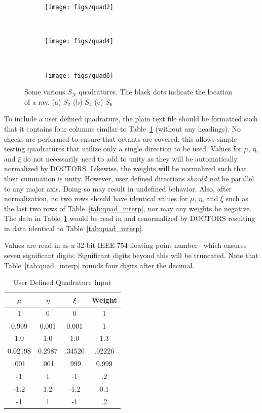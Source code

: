 \begin{figure}
    \centering
    \begin{subfigure}[b]{0.3\textwidth}
        \texttt{[image: figs/quad2]}
        \caption{}
        \label{fig:quad2}
    \end{subfigure}
    ~ 
    \begin{subfigure}[b]{0.3\textwidth}
        \texttt{[image: figs/quad4]}
        \caption{}
        \label{fig:quad4}
    \end{subfigure}
    ~ 
    \begin{subfigure}[b]{0.3\textwidth}
        \texttt{[image: figs/quad6]}
        \caption{}
        \label{fig:quad6}
    \end{subfigure}
    \caption{Some various $S_N$ quadratures. The black dots indicate the location of a ray. (a) $S_2$ (b) $S_4$ (c) $S_6$ }\label{fig:quad}
\end{figure}

To include a user defined quadrature, the plain text file should be formatted such that it contains four columns similar to Table~\ref{tab:quad_format} (without any headings). No checks are performed to ensure that octants are covered, this allows simple testing quadratures that utilize only a single direction to be used. Values for $\mu$, $\eta$, and $\xi$ do not necessarily need to add to unity as they will be automatically normalized by DOCTORS. Likewise, the weights will be normalized such that their summation is unity. However, user defined directions \textit{should not} be parallel to any major axis. Doing so may result in undefined behavior. Also, after normalization, no two rows should have identical values for $\mu$, $\eta$, and $\xi$ such as the last two rows of Table~\ref{tab:quad_interp}, nor may any weights be negative. The data in Table~\ref{tab:quad_format} would be read in and renormalized by DOCTORS resulting in data identical to  Table~\ref{tab:quad_interp}.

Values are read in as a 32-bit IEEE-754 floating point number~\citep{ref:ieee754} which ensures seven significant digits. Significant digits beyond this will be truncated. Note that Table~\ref{tab:quad_interp} rounds four digits after the decimal.

\begin{table}[ht]
\caption{User Defined Quadrature Input}
\centering 
\begin{tabular}{c c c c}
\hline \hline   
$\mu$    & $\eta$ & $\xi$ & Weight\\ [0.5ex] 
\hline
1        & 0      & 0      & 1 \\
0.999    & 0.001  & 0.001  & 1 \\
1.0      & 1.0    & 1.0    & 1.3 \\
0.02198  & 0.2987 & .34520 & .02226 \\
.001     & .001   & .999   & 0.999 \\
-1       & 1      & -1     & .2 \\
-1.2     & 1.2    & -1.2   & 0.1 \\
-1        & 1     & -1     & .2 \\ [1ex]
\hline
\end{tabular}
\label{tab:quad_format}
\end{table}

